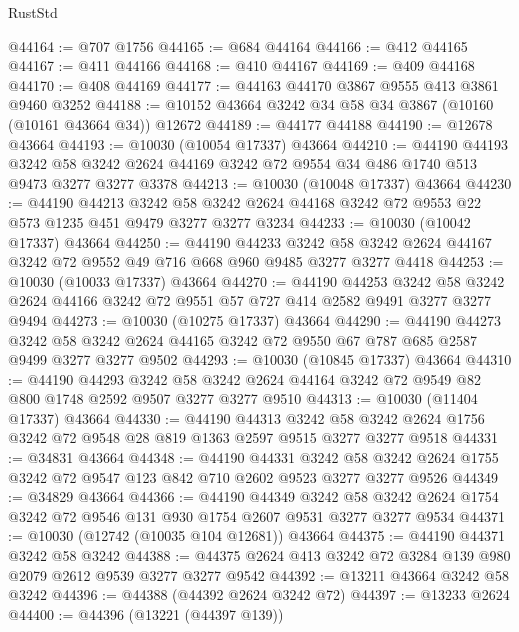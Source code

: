 \begin{lexlean}{RustStd}
\begin{coremodule}
@44164 := @707 @1756
@44165 := @684 @44164
@44166 := @412 @44165
@44167 := @411 @44166
@44168 := @410 @44167
@44169 := @409 @44168
@44170 := @408 @44169
@44177 := @44163 @44170 @3867 @9555 @413 @3861 @9460 @3252
@44188 := @10152 @43664 @3242 @34 @58 @34 @3867 (@10160 (@10161 @43664 @34)) @12672
@44189 := @44177 @44188
@44190 := @12678 @43664
@44193 := @10030 (@10054 @17337) @43664
@44210 := @44190
    @44193
    @3242
    @58
    @3242
    @2624
    @44169
    @3242
    @72
    @9554
    @34
    @486
    @1740
    @513
    @9473
    @3277
    @3277
    @3378
@44213 := @10030 (@10048 @17337) @43664
@44230 := @44190
    @44213
    @3242
    @58
    @3242
    @2624
    @44168
    @3242
    @72
    @9553
    @22
    @573
    @1235
    @451
    @9479
    @3277
    @3277
    @3234
@44233 := @10030 (@10042 @17337) @43664
@44250 := @44190
    @44233
    @3242
    @58
    @3242
    @2624
    @44167
    @3242
    @72
    @9552
    @49
    @716
    @668
    @960
    @9485
    @3277
    @3277
    @4418
@44253 := @10030 (@10033 @17337) @43664
@44270 := @44190
    @44253
    @3242
    @58
    @3242
    @2624
    @44166
    @3242
    @72
    @9551
    @57
    @727
    @414
    @2582
    @9491
    @3277
    @3277
    @9494
@44273 := @10030 (@10275 @17337) @43664
@44290 := @44190
    @44273
    @3242
    @58
    @3242
    @2624
    @44165
    @3242
    @72
    @9550
    @67
    @787
    @685
    @2587
    @9499
    @3277
    @3277
    @9502
@44293 := @10030 (@10845 @17337) @43664
@44310 := @44190
    @44293
    @3242
    @58
    @3242
    @2624
    @44164
    @3242
    @72
    @9549
    @82
    @800
    @1748
    @2592
    @9507
    @3277
    @3277
    @9510
@44313 := @10030 (@11404 @17337) @43664
@44330 := @44190
    @44313
    @3242
    @58
    @3242
    @2624
    @1756
    @3242
    @72
    @9548
    @28
    @819
    @1363
    @2597
    @9515
    @3277
    @3277
    @9518
@44331 := @34831 @43664
@44348 := @44190
    @44331
    @3242
    @58
    @3242
    @2624
    @1755
    @3242
    @72
    @9547
    @123
    @842
    @710
    @2602
    @9523
    @3277
    @3277
    @9526
@44349 := @34829 @43664
@44366 := @44190
    @44349
    @3242
    @58
    @3242
    @2624
    @1754
    @3242
    @72
    @9546
    @131
    @930
    @1754
    @2607
    @9531
    @3277
    @3277
    @9534
@44371 := @10030 (@12742 (@10035 @104 @12681)) @43664
@44375 := @44190 @44371 @3242 @58 @3242
@44388 := @44375 @2624 @413 @3242 @72 @3284 @139 @980 @2079 @2612 @9539 @3277 @3277 @9542
@44392 := @13211 @43664 @3242 @58 @3242
@44396 := @44388 (@44392 @2624 @3242 @72)
@44397 := @13233 @2624
@44400 := @44396 (@13221 (@44397 @139))

\end{coremodule}
\end{lexlean}
